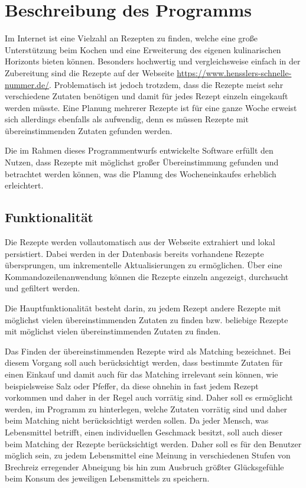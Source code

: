 \chapter{Beschreibung des Programms}
Im Internet ist eine Vielzahl an Rezepten zu finden, welche eine große Unterstützung beim Kochen und eine Erweiterung des eigenen kulinarischen Horizonts bieten können. Besonders hochwertig und vergleichsweise einfach in der Zubereitung sind die Rezepte auf der Webseite \url{https://www.hensslers-schnelle-nummer.de/}. Problematisch ist jedoch trotzdem, dass die Rezepte meist sehr verschiedene Zutaten benötigen und damit für jedes Rezept einzeln eingekauft werden müsste. Eine Planung mehrerer Rezepte ist für eine ganze Woche erweist sich allerdings ebenfalls als aufwendig, denn es müssen Rezepte mit übereinstimmenden Zutaten gefunden werden.

Die im Rahmen dieses Programmentwurfs entwickelte Software erfüllt den Nutzen, dass Rezepte mit möglichst großer Übereinstimmung gefunden und betrachtet werden können, was die Planung des Wocheneinkaufes erheblich erleichtert.

\section{Funktionalität}
Die Rezepte werden vollautomatisch aus der Webseite extrahiert und lokal persistiert. Dabei werden in der Datenbasis bereits vorhandene Rezepte übersprungen, um inkrementelle Aktualisierungen zu ermöglichen. Über eine Kommandozeilenanwendung können die Rezepte einzeln angezeigt, durchsucht und gefiltert werden.

Die Hauptfunktionalität besteht darin, zu jedem Rezept andere Rezepte mit möglichst vielen übereinstimmenden Zutaten zu finden bzw. beliebige Rezepte mit möglichst vielen übereinstimmenden Zutaten zu finden. 

Das Finden der übereinstimmenden Rezepte wird als Matching bezeichnet. Bei diesem Vorgang soll auch berücksichtigt werden, dass bestimmte Zutaten für einen Einkauf und damit auch für das Matching irrelevant sein können, wie beispielsweise Salz oder Pfeffer, da diese ohnehin in fast jedem Rezept vorkommen und daher in der Regel auch vorrätig sind. Daher soll es ermöglicht werden, im Programm zu hinterlegen, welche Zutaten vorrätig sind und daher beim Matching nicht berücksichtigt werden sollen. Da jeder Mensch, was Lebensmittel betrifft, einen individuellen Geschmack besitzt, soll auch dieser beim Matching der Rezepte berücksichtigt werden. Daher soll es für den Benutzer möglich sein, zu jedem Lebensmittel eine Meinung in verschiedenen Stufen von Brechreiz erregender Abneigung bis hin zum Ausbruch größter Glücksgefühle beim Konsum des jeweiligen Lebensmittels zu speichern.

